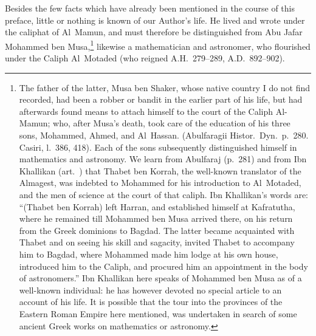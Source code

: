 Besides the few facts which have already been mentioned in the course of this preface, little or nothing is known of our Author's life. He lived and wrote under the caliphat of Al~Mamun, and must therefore be distinguished from Abu Jafar Mohammed ben Musa,\footnote{The father of the latter, Musa ben Shaker, whose native country I do not find recorded, had been a robber or bandit in the earlier part of his life, but had afterwards found means to attach himself to the court of the Caliph Al-Mamun; who, after Musa's death, took care of the education of his three sons, Mohammed, Ahmed, and Al~Hassan. (Abulfaragii Histor.~Dyn.~p.~280. Casiri, l.~386, 418). Each of the sons subsequently distinguished himself in mathematics and astronomy. We learn from Abulfaraj (p.~281) and from Ibn Khallikan (art.~) that Thabet ben Korrah, the well-known translator of the Almagest, was indebted to Mohammed for his introduction to Al~Motaded, and the men of science at the court of that caliph. Ibn Khallikan's words are:  ``(Thabet ben Korrah) left Harran, and established himself at Kafratutha, where he remained till Mohammed ben Musa arrived there, on his return from the Greek dominions to Bagdad. The latter became acquainted with Thabet and on seeing his skill and sagacity, invited Thabet to accompany him to Bagdad, where Mohammed made him lodge at his own house, introduced him to the Caliph, and procured him an appointment in the body of astronomers.'' Ibn Khallikan here speaks of Mohammed ben Musa as of a well-known individual: he has however devoted no special article to an account of his life. It is possible that the tour into the provinces of the Eastern Roman Empire here mentioned, was undertaken in search of some ancient Greek works on mathematics or astronomy.} likewise a mathematician and astronomer, who flourished under the Caliph Al~Motaded (who reigned A.H.~279--289, A.D.~892--902).

